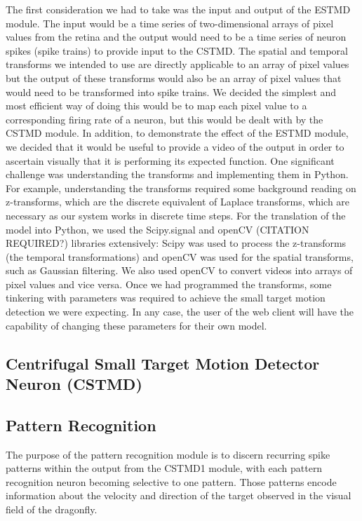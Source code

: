 \documentclass[a4paper,11pt]{article}
\begin{document}
The first consideration we had to take was the input and output of the ESTMD module. The input would be a time series of two-dimensional arrays of pixel values from the retina and the output would need to be a time series of neuron spikes (spike trains) to provide input to the CSTMD. The spatial and temporal transforms we intended to use are directly applicable to an array of pixel values but the output of these transforms would also be an array of pixel values that would need to be transformed into spike trains. We decided the simplest and most efficient way of doing this would be to map each pixel value to a corresponding firing rate of a neuron, but this would be dealt with by the CSTMD module. In addition, to demonstrate the effect of the ESTMD module, we decided that it would be useful to provide a video of the output in order to ascertain visually that it is performing its expected function.
\newline
\newline
One significant challenge was understanding the transforms and implementing them in Python. For example, understanding the transforms required some background reading on z-transforms, which are the discrete equivalent of Laplace transforms, which are necessary as our system works in discrete time steps. For the translation of the model into Python, we used the Scipy.signal and openCV (CITATION REQUIRED?) libraries extensively: Scipy was used to process the z-transforms (the temporal transformations) and openCV was used for the spatial transforms, such as Gaussian filtering. We also used openCV to convert videos into arrays of pixel values and vice versa.
\newline
\newline
Once we had programmed the transforms, some tinkering with parameters was required to achieve the small target motion detection we were expecting. In any case, the user of the web client will have the capability of changing these parameters for their own model.

\subsection{Centrifugal Small Target Motion Detector Neuron (CSTMD)}

\subsection{Pattern Recognition}

The purpose of the pattern recognition module is to discern recurring spike patterns within the output from the CSTMD1 module, with each pattern recognition neuron becoming selective to one pattern. Those patterns encode information about the velocity and direction of the target observed in the visual field of the dragonfly.\par
\end{document}
